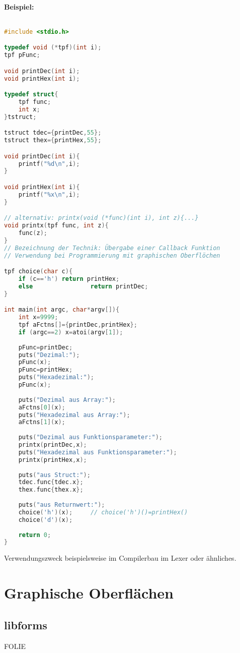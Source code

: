 \paragraph{Beispiel:} $ $
\begin{lstlisting}[language=C]
#include <stdio.h>

typedef void (*tpf)(int i);
tpf pFunc;

void printDec(int i);
void printHex(int i);

typedef struct{
	tpf func;
	int x;
}tstruct;

tstruct tdec={printDec,55};
tstruct thex={printHex,55};

void printDec(int i){
	printf("%d\n",i);
}

void printHex(int i){
	printf("%x\n",i);
}

// alternativ: printx(void (*func)(int i), int z){...}
void printx(tpf func, int z){
	func(z);
}
// Bezeichnung der Technik: Übergabe einer Callback Funktion
// Verwendung bei Programmierung mit graphischen Oberflöchen

tpf choice(char c){
	if (c=='h')	return printHex;
	else 				return printDec;
}

int main(int argc, char*argv[]){
	int x=9999;
	tpf aFctns[]={printDec,printHex};
	if (argc==2) x=atoi(argv[1]);
	
	pFunc=printDec;
	puts("Dezimal:");
	pFunc(x);
	pFunc=printHex;
	puts("Hexadezimal:");
	pFunc(x);
	
	puts("Dezimal aus Array:");
	aFctns[0](x);
	puts("Hexadezimal aus Array:");
	aFctns[1](x);
	
	puts("Dezimal aus Funktionsparameter:");
	printx(printDec,x);
	puts("Hexadezimal aus Funktionsparameter:");
	printx(printHex,x);
	
	puts("aus Struct:");
	tdec.func{tdec.x};
	thex.func{thex.x};	
	
	puts("aus Returnwert:");
	choice('h')(x);		// choice('h')()=printHex()
	choice('d')(x);		
		
	return 0;
}
\end{lstlisting}

Verwendungszweck beispielsweise im Compilerbau im Lexer oder ähnliches.

\section{Graphische Oberflächen}
\subsection{libforms}
FOLIE
